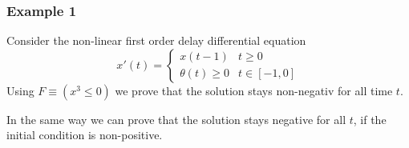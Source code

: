 \documentclass[10pt]{report}
\begin{document}
            \subsubsection{Example 1}
                \label{sec:ddi-example-1}
                Consider the non-linear first order delay differential equation
                \begin{equation}
                    x'(t) = \begin{cases}
                         x(t-1) & t \geq 0\\
                         \theta(t)\geq 0 & t \in [-1,0]
                    \end{cases}
                \end{equation}
                Using $F\equiv(x^3\leq 0)$ we prove that the solution stays non-negativ for all time $t$.
                \begin{sequentdeduction}
                \end{sequentdeduction}
                In the same way we can prove that the solution stays negative for all $t$, if the initial condition is non-positive.
\end{document}
